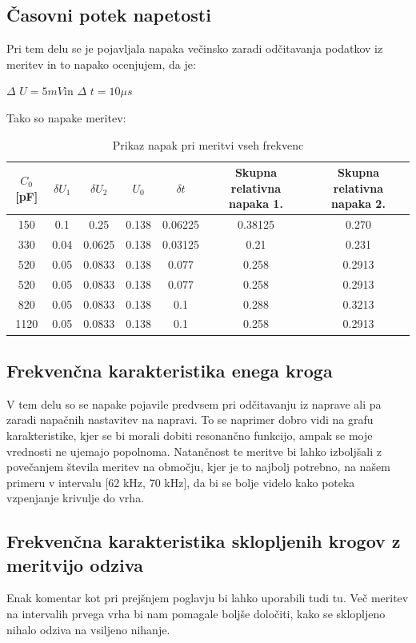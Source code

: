 \documentclass[11pt, a4paper]{article}
\theoremstyle{definition}
\theoremstyle{example}
\theoremstyle{izrek}
\begin{document}
\subsection{Časovni potek napetosti}
Pri tem delu se je pojavljala napaka večinsko zaradi odčitavanja podatkov iz meritev in to napako ocenjujem, da je:
\begin{center}
$\Delta$ $U =5 mV$\quad in \quad $\Delta$ $t=10 \mu s$
\end{center}  
Tako so napake meritev:
\begin{table}[ht]
	\centering
	\begin{tabular}{|c|c|c|c|c|c|c|}
		\hline
		$C_0$ [pF] & $\delta U_1$ & $\delta U_2$ & $U_0$ & $\delta t$ & Skupna relativna napaka 1. &Skupna relativna napaka 2.\\
		\hline
		\hline
		150 & 0.1 & 0.25 & 0.138 & 0.06225 & 0.38125 & 0.270 \\
		\hline
		330 & 0.04 & 0.0625 & 0.138 & 0.03125 & 0.21 & 0.231 \\
		\hline
		520 & 0.05 & 0.0833 & 0.138 & 0.077 & 0.258 & 0.2913 \\
		\hline
		520 & 0.05 & 0.0833 & 0.138 & 0.077 & 0.258 & 0.2913 \\
		\hline
		820 & 0.05 & 0.0833 & 0.138 & 0.1& 0.288 & 0.3213 \\
		\hline
		1120 & 0.05 & 0.0833 & 0.138 & 0.1& 0.258 & 0.2913 \\
		\hline
		\end{tabular}
		\caption{Prikaz napak pri meritvi vseh frekvenc}
		\label{tab:FirstTable}
\end{table}

\subsection{Frekvenčna karakteristika enega kroga}
V tem delu so se napake pojavile predvsem pri odčitavanju iz naprave ali pa zaradi napačnih nastavitev na napravi. To se naprimer dobro vidi na grafu karakteristike, kjer se bi morali dobiti resonančno funkcijo, ampak se moje vrednosti ne ujemajo popolnoma. Natančnost te meritve bi lahko izboljšali z povečanjem števila meritev na območju, kjer je to najbolj potrebno, na našem primeru v intervalu [62 kHz, 70 kHz], da bi se bolje videlo kako poteka vzpenjanje krivulje do vrha.

\subsection{Frekvenčna karakteristika sklopljenih krogov z meritvijo odziva}
Enak komentar kot pri prejšnjem poglavju bi lahko uporabili tudi tu. Več meritev na intervalih prvega vrha bi nam pomagale boljše določiti, kako se sklopljeno nihalo odziva na vsiljeno nihanje. 
\end{document}
